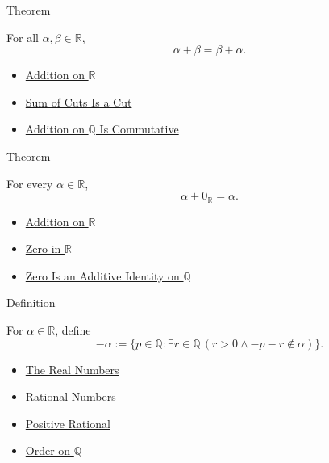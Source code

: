\begin{theorembox}{Theorem}
\begin{theorem}
\label{thm:addition-on-r-commutative}
For all $\alpha,\beta\in\mathbb{R}$,
\[
\alpha+\beta=\beta+\alpha.
\]
\end{theorem}
\end{theorembox}

\begin{dependencies}
\begin{itemize}
  \item \hyperref[def:addition-on-r]{Addition on $\mathbb{R}$}
  \item \hyperref[lem:sum-of-cuts-is-a-cut]{Sum of Cuts Is a Cut}
  \item \hyperref[thm:addition-on-q-commutative]{Addition on $\mathbb{Q}$ Is Commutative}
\end{itemize}
\end{dependencies}

\begin{theorembox}{Theorem}
\begin{theorem}
\label{thm:zero-additive-identity-on-r}
For every $\alpha\in\mathbb{R}$,
\[
\alpha+0_{\mathbb{R}}=\alpha.
\]
\end{theorem}
\end{theorembox}

\begin{dependencies}
\begin{itemize}
  \item \hyperref[def:addition-on-r]{Addition on $\mathbb{R}$}
  \item \hyperref[def:zero-in-r]{Zero in $\mathbb{R}$}
  \item \hyperref[thm:zero-additive-identity-on-q]{Zero Is an Additive Identity on $\mathbb{Q}$}
\end{itemize}
\end{dependencies}

\begin{definitionbox}{Definition}
\begin{definition}
\label{def:negation-on-r}
For $\alpha\in\mathbb{R}$, define
\[
-\alpha:=\{p\in\mathbb{Q}:\exists r\in\mathbb{Q}\,(r>0\land -p-r\notin\alpha)\}.
\]
\end{definition}
\end{definitionbox}

\begin{dependencies}
\begin{itemize}
  \item \hyperref[def:reals]{The Real Numbers}
  \item \hyperref[def:rationals]{Rational Numbers}
  \item \hyperref[def:positive-rational]{Positive Rational}
  \item \hyperref[def:order-on-q]{Order on $\mathbb{Q}$}
\end{itemize}
\end{dependencies}

